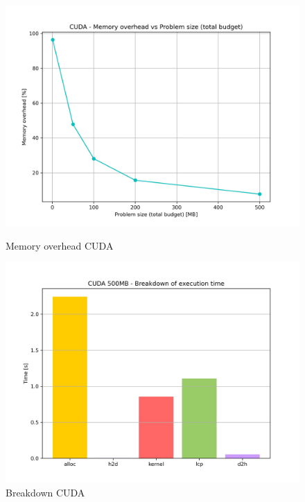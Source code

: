 				\begin{figure}[H]
						\centering
						\begin{minipage}[t]{0.49\textwidth}
							\centering
							\includegraphics[width=\textwidth]{img/cuda_plots/cuda_memory_overhead.jpg}
							\caption{Memory overhead CUDA}
							\label{fig:cuda_mem_overhead}
						\end{minipage}
						\hfill
						\begin{minipage}[t]{0.49\textwidth}
							\centering
							\includegraphics[width=\textwidth]{img/cuda_plots/cuda_breakdown_100MB.jpg}
							\caption{Breakdown CUDA}
							\label{fig:cuda_breakdown}
						\end{minipage}
				\end{figure}
			
